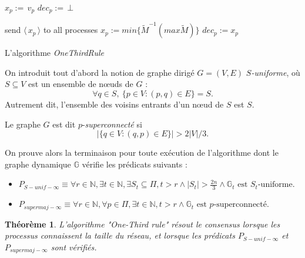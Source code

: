 \documentclass{article}
\newtheorem{theorem}{Théorème}
\begin{document}
\begin{algorithm}[htb]
\begin{distribalgo}[1]
\BLANK {}
  \STATE $x_p :=\, v_p$ 
  \STATE $dec_p :=\, \bot$ 

\ENDINDENT \BLANK

    \STATE send $\langle\, x_p\, \rangle$ to all processes
  \ENDINDENT
  \BLANK
	  \STATE $x_p := min \{\widetilde{M}^{-1} (max \widetilde{M})\}$ 
		  \STATE $dec_p := x_p$ 
        \ENDIF
      \ENDIF
  \ENDINDENT
\ENDINDENT \BLANK


\caption{L'algorithme {\em OneThirdRule}} \label{algo:R}
\end{distribalgo}

\end{algorithm}

On introduit tout d'abord la notion de graphe dirigé $G=(V,E)$ \emph{$S$-uniforme}, où $S\subseteq V$ est un ensemble de nœuds de $G$ :
	$$ \forall q \in S, \  \{ p \in V : (p,q) \in E\} = S .$$
Autrement dit, l'ensemble des voisins entrants d'un n\oe ud de $S$ est $S$.

Le graphe $G$ est dit $p$-\emph{superconnect\'e} si 
	$$ | \{ q \in V : (q ,p ) \in E\} | > 2 |V|/3 .$$

On prouve alors la terminaison pour toute exécution de l'algorithme dont le graphe dynamique $ \mathds{G} $ vérifie  les prédicats suivants :
\begin{itemize}
	\item $P_{S-unif-\infty} \equiv
		\forall r \in \mathds{N}, \exists t \in \mathds{N}, \exists S_t \subseteq \Pi, t > r  \wedge |S_t | > \frac{2 n}{3} \wedge  \mathds{G}_t \mbox{ est $S_t $-uniforme} .$
	 \item $P_{supermaj-\infty} \equiv
		\forall r \in \mathds{N}, \forall p\in\Pi, \exists t \in \mathds{N}, t > r  \wedge \mathds{G}_t \mbox{ est $p$-superconnect\'e} .$
\end{itemize}

\begin{theorem}
	L'algorithme "One-Third rule" résout  le consensus lorsque les processus connaissent la taille du réseau,
	et lorsque les prédicats $P_{S-unif-\infty}$ et $P_{supermaj-\infty}$ sont vérifiés.
\end{theorem}
\end{document}
